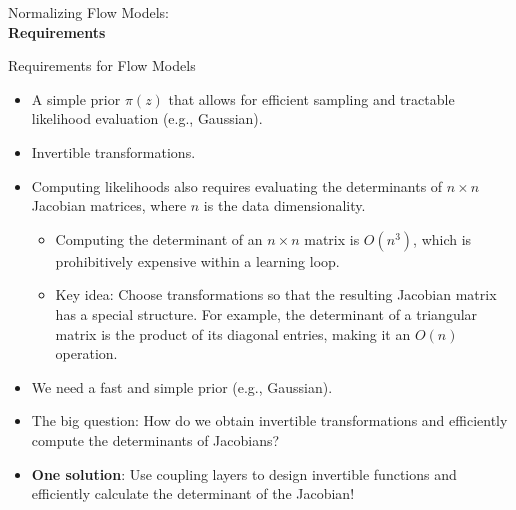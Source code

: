\begin{frame}[allowframebreaks]{}
    \LARGE Normalizing Flow Models: \\[1.5ex] \textbf{Requirements}
\end{frame}

\begin{frame}[allowframebreaks]{Requirements for Flow Models}
\begin{itemize}
    \item A simple prior $\pi(z)$ that allows for efficient sampling and tractable likelihood evaluation (e.g., Gaussian).
    \item Invertible transformations.
    \item Computing likelihoods also requires evaluating the determinants of $n \times n$ Jacobian matrices, where $n$ is the data dimensionality.
    \begin{itemize}
        \item Computing the determinant of an $n \times n$ matrix is $O(n^3)$, which is prohibitively expensive within a learning loop.
        \item Key idea: Choose transformations so that the resulting Jacobian matrix has a special structure. For example, the determinant of a triangular matrix is the product of its diagonal entries, making it an $O(n)$ operation.
    \end{itemize}
\end{itemize}
\framebreak

\begin{itemize}
    \item We need a fast and simple prior (e.g., Gaussian).
    \item The big question: How do we obtain invertible transformations and efficiently compute the determinants of Jacobians?
    \item \textbf{One solution}: Use coupling layers to design invertible functions and efficiently calculate the determinant of the Jacobian!
\end{itemize}
\end{frame}
